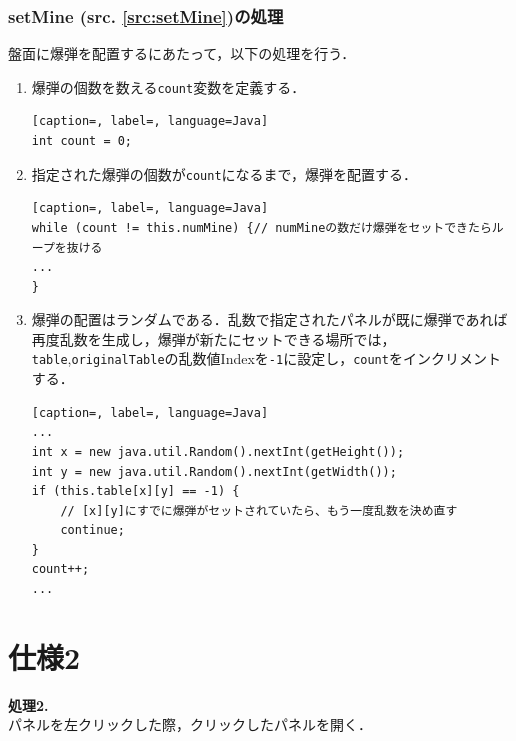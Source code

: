 \documentclass[a4j,11pt]{jsarticle}
\newcommand{\srcref}[1]{src. \ref{#1}}
\newcommand{\met}[1]{\ttfamily #1 \normalfont (\srcref{src:#1})の処理}
\begin{document}
\subsubsection*{\met{setMine}}
盤面に爆弾を配置するにあたって，以下の処理を行う．
\begin{enumerate}
    \item 爆弾の個数を数える\verb|count|変数を定義する．
          \begin{lstlisting}[caption=, label=, language=Java]
int count = 0;
\end{lstlisting}
    \item 指定された爆弾の個数が\verb|count|になるまで，爆弾を配置する．
          \begin{lstlisting}[caption=, label=, language=Java]
while (count != this.numMine) {// numMineの数だけ爆弾をセットできたらループを抜ける
...
}
    \end{lstlisting}
    \item 爆弾の配置はランダムである．乱数で指定されたパネルが既に爆弾であれば再度乱数を生成し，爆弾が新たにセットできる場所では，\verb|table|,\verb|originalTable|の乱数値Indexを\verb|-1|に設定し，\verb|count|をインクリメントする．
          \begin{lstlisting}[caption=, label=, language=Java]
...
int x = new java.util.Random().nextInt(getHeight());
int y = new java.util.Random().nextInt(getWidth());
if (this.table[x][y] == -1) {
    // [x][y]にすでに爆弾がセットされていたら、もう一度乱数を決め直す
    continue;
}
count++;
...
    \end{lstlisting}
\end{enumerate}
\newpage
\section*{仕様2}
\setcounter{subsection}{0}
\setcounter{section}{2}
\begin{screen}
    \textbf{処理2.}\\
    パネルを左クリックした際，クリックしたパネルを開く．
\end{screen}
\end{document}
